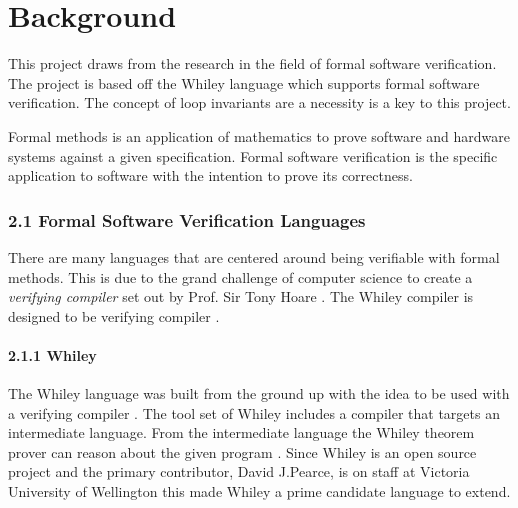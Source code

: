 \chapter{Background}\label{C:background}
%


This project draws from the research in the field of formal software verification.
The project is based off the Whiley language which supports formal software
verification. %
The concept of loop invariants are a necessity is a key to this project.

Formal methods is an application of mathematics to prove software and hardware
systems against a given specification. %
Formal software verification is the specific application to software with
the intention to prove its correctness.



\subsection*{2.1 Formal Software Verification Languages}

There are many languages that are centered around being verifiable
with formal methods.
This is due to the grand challenge of computer science
to create a \textit{verifying compiler} set out by Prof. Sir Tony Hoare \cite{Hoare-grand}.
The Whiley compiler is designed to be verifying compiler \cite{whiley-origin}.

\subsubsection*{2.1.1 Whiley}

The Whiley language was built from the ground up with the idea to be used with
a verifying compiler \cite{whiley-origin}.
The tool set of Whiley includes a compiler that targets an intermediate
language. From the intermediate language the Whiley theorem prover can reason
about the given program \cite{whiley-design} \cite{whiley-origin}.
Since Whiley is an open source project and the primary contributor, David
J.Pearce, is on staff at Victoria University of Wellington this made Whiley a
prime candidate language to extend.

